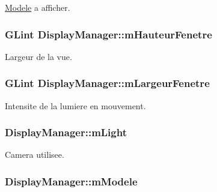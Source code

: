 \hyperlink{class_modele}{Modele} a afficher. 

\hypertarget{class_display_manager_a73b96e4ef8a0621077bcc83bc1dba2cf}{
\subsubsection[{m\+Hauteur\+Fenetre}]{\setlength{\rightskip}{0pt plus 5cm}G\+Lint Display\+Manager\+::m\+Hauteur\+Fenetre}}\label{class_display_manager_a73b96e4ef8a0621077bcc83bc1dba2cf}


Largeur de la vue. 

\hypertarget{class_display_manager_a7078a2a1023ebe660ce2e3007a988a62}{
\subsubsection[{m\+Largeur\+Fenetre}]{\setlength{\rightskip}{0pt plus 5cm}G\+Lint Display\+Manager\+::m\+Largeur\+Fenetre}}\label{class_display_manager_a7078a2a1023ebe660ce2e3007a988a62}


Intensite de la lumiere en mouvement. 

\hypertarget{class_display_manager_a012e14f7761f19a3d049aae93f5d694b}{
\subsubsection[{m\+Light}]{ Display\+Manager\+::m\+Light}}\label{class_display_manager_a012e14f7761f19a3d049aae93f5d694b}


Camera utilisee. 

\hypertarget{class_display_manager_a0c8ba3fe8aece87fc924847fc8958398}{
\subsubsection[{m\+Modele}]{ Display\+Manager\+::m\+Modele}}\label{class_display_manager_a0c8ba3fe8aece87fc924847fc8958398}


